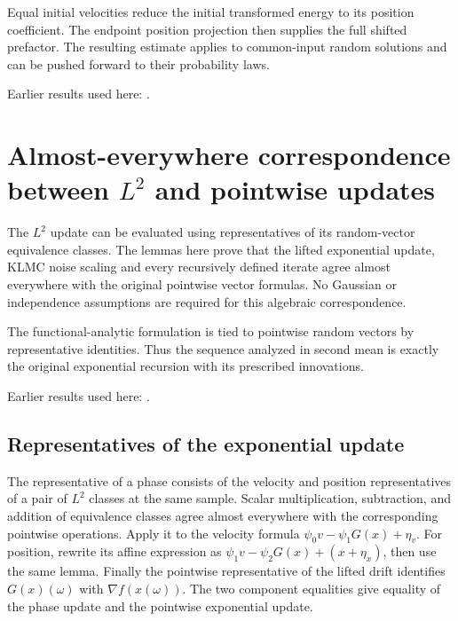 \documentclass[11pt,a4paper]{report}
\begin{document}
Equal initial velocities reduce the initial transformed energy to its position coefficient. The endpoint position projection then supplies the full shifted prefactor. The resulting estimate applies to common-input random solutions and can be pushed forward to their probability laws.



Earlier results used here: \cite[Section~3.13.2]{LangevinLean2026ULASC}.
\section{\texorpdfstring{Almost-everywhere correspondence between \(L^{2}\) and pointwise updates}{Almost-everywhere correspondence between L² and pointwise updates}}
\label{proof-module-KineticLangevin-LpDynamics-lean}


The \(L^{2}\) update can be evaluated using representatives of its random-vector equivalence classes. The lemmas here prove that the lifted exponential update, KLMC noise scaling and every recursively defined iterate agree almost everywhere with the original pointwise vector formulas. No Gaussian or independence assumptions are required for this algebraic correspondence.



The functional-analytic formulation is tied to pointwise random vectors by representative identities. Thus the sequence analyzed in second mean is exactly the original exponential recursion with its prescribed innovations.



Earlier results used here: \cite[Section~3.13]{LangevinLean2026ULASC}.
\subsection{\texorpdfstring{Representatives of the exponential update}{Representatives of the exponential update}}
\label{report-step-KineticLangevin-LpDynamics-lean-1}


The representative of a phase consists of the velocity and position representatives of a pair of \(L^{2}\) classes at the same sample. Scalar multiplication, subtraction, and addition of equivalence classes agree almost everywhere with the corresponding pointwise operations. Apply it to the velocity formula \(\psi_0v-\psi_1G(x)+\eta_v\). For position, rewrite its affine expression as \(\psi_1v-\psi_2G(x)+(x+\eta_x)\), then use the same lemma. Finally the pointwise representative of the lifted drift identifies \(G(x)(\omega)\) with \(\nabla f(x(\omega))\). The two component equalities give equality of the phase update and the pointwise exponential update.
\end{document}
